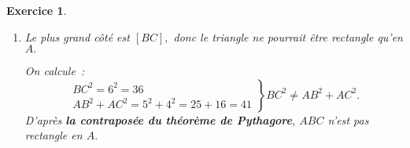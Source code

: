 \documentclass[10pt]{article}
\newtheorem{exo}{Exercice}
\begin{document}
\begin{exo}
\begin{enumerate}
\begin{multicols}{2}
\danger Sauf si l'énoncé le demande, ne donnez pas de valeur approchée.

\end{multicols}
\item Le plus grand côté est $\left[BC\right],$ donc le triangle ne pourrait être rectangle qu'en $A.$

On calcule~:
\[
\left.
    \begin{array}{ll}
        BC^2=6^2=36\\
        AB^2+AC^2=5^2+4^2=25+16=41
    \end{array}
\right \}BC^2\not=AB^2+AC^2.
\]
D'après \textbf{la contraposée du théorème de Pythagore}, $ABC$ n'est pas rectangle en $A.$

\end{enumerate}

\end{exo}
\end{document}
